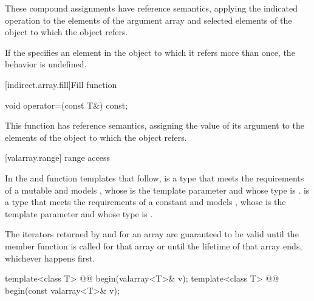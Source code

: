 \begin{itemdescr}
\pnum
These compound assignments have reference semantics, applying the indicated
operation to the elements of the argument array and selected elements of the
object to which the
object refers.

\pnum
If the
specifies an element in the
object to which it refers more than once,
the behavior is undefined.
\end{itemdescr}

[indirect.array.fill]{Fill function}

%
\begin{itemdecl}
void operator=(const T&) const;
\end{itemdecl}

\begin{itemdescr}
\pnum
This function has reference semantics, assigning the value of its argument
to the elements of the
object to which the
object refers.
\end{itemdescr}

[valarray.range]{ range access}

\pnum
In the  and  function templates that follow, 
is a type that meets the requirements of a mutable
and models ,
whose  is the template
parameter  and whose  type is .  is a
type that meets the requirements of a constant
and models ,
whose  is the template
parameter  and whose  type is .

\pnum
The iterators returned by  and  for an array
are guaranteed to be valid until the member function
 is called for that
array or until the lifetime of that array ends, whichever happens
first.

%
\begin{itemdecl}
template<class T> @@ begin(valarray<T>& v);
template<class T> @@ begin(const valarray<T>& v);
\end{itemdecl}

